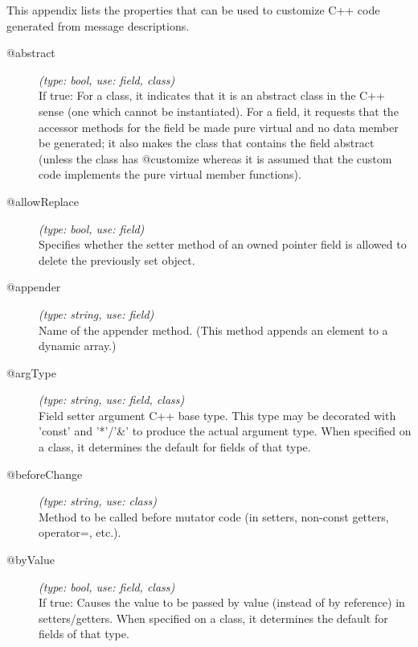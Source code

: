 \label{cha:msg-properties}

This appendix lists the properties that can be used to customize C++ code
generated from message descriptions.

%
%

\begin{description}
\item[@abstract] \textit{(type: bool, use: field, class)} \\
  If true: For a class, it indicates that it is an abstract class in the C++
  sense (one which cannot be instantiated). For a field, it requests that the
  accessor methods for the field be made pure virtual and no data member be
  generated; it also makes the class that contains the field abstract (unless
  the class has @customize whereas it is assumed that the custom code
  implements the pure virtual member functions).

\item[@allowReplace] \textit{(type: bool, use: field)} \\
  Specifies whether the setter method of an owned pointer field is allowed to
  delete the previously set object.

\item[@appender] \textit{(type: string, use: field)} \\
  Name of the appender method. (This method appends an element to a dynamic
  array.)

\item[@argType] \textit{(type: string, use: field, class)} \\
  Field setter argument C++ base type. This type may be decorated with 'const'
  and '*'/'\&' to produce the actual argument type. When specified on a class,
  it determines the default for fields of that type.

\item[@beforeChange] \textit{(type: string, use: class)} \\
  Method to be called before mutator code (in setters, non-const getters,
  operator=, etc.).

\item[@byValue] \textit{(type: bool, use: field, class)} \\
  If true: Causes the value to be passed by value (instead of by reference) in
  setters/getters. When specified on a class, it determines the default for
  fields of that type.


\end{description}
